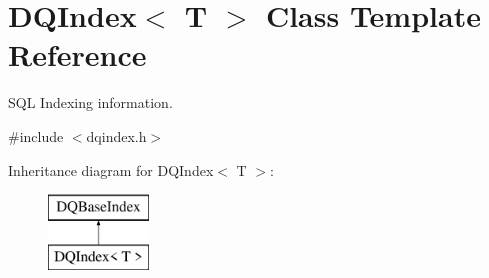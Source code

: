 \hypertarget{classDQIndex}{
\section{DQIndex$<$ T $>$ Class Template Reference}
\label{classDQIndex}
}


SQL Indexing information.  




{\ttfamily \#include $<$dqindex.h$>$}

Inheritance diagram for DQIndex$<$ T $>$:\begin{figure}[H]
\begin{center}
\leavevmode
\includegraphics[height=2.000000cm]{classDQIndex}
\end{center}
\end{figure}
